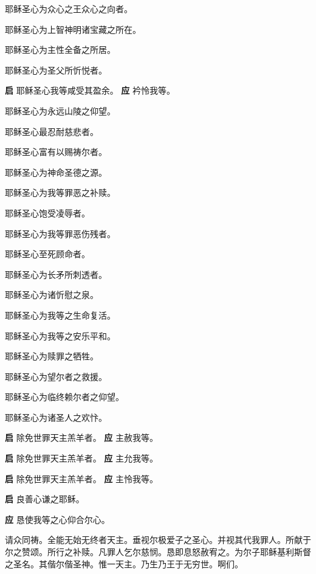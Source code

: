 \documentclass[UTF8,17pt]{ctexart}
\begin{document}
 耶稣圣⼼为众⼼之王众⼼之向者。

 耶稣圣⼼为上智神明诸宝藏之所在。

 耶稣圣⼼为主性全备之所居。

 耶稣圣⼼为圣⽗所忻悦者。

\textbf{启} \quad 耶稣圣⼼我等咸受其盈余。 \hfill \textbf{应} \quad 衿怜我等。

 耶稣圣⼼为永远⼭陵之仰望。

 耶稣圣⼼最忍耐慈悲者。

 耶稣圣⼼富有以赐祷尔者。

 耶稣圣⼼为神命圣德之源。

 耶稣圣⼼为我等罪恶之补赎。

 耶稣圣⼼饱受凌辱者。

 耶稣圣⼼为我等罪恶伤残者。

 耶稣圣⼼⾄死顾命者。

 耶稣圣⼼为长⽭所刺透者。

 耶稣圣⼼为诸忻慰之泉。

 耶稣圣⼼为我等之⽣命复活。

 耶稣圣⼼为我等之安乐平和。

 耶稣圣⼼为赎罪之牺牲。

 耶稣圣⼼为望尔者之救援。

 耶稣圣⼼为临终赖尔者之仰望。

 耶稣圣⼼为诸圣⼈之欢忭。

\textbf{启} \quad 除免世罪天主羔⽺者。 \hfill \textbf{应} \quad 主赦我等。

\textbf{启} \quad 除免世罪天主羔⽺者。 \hfill \textbf{应} \quad 主允我等。

\textbf{启} \quad 除免世罪天主羔⽺者。 \hfill \textbf{应} \quad 主怜我等。

\textbf{启} \quad 良善⼼谦之耶稣。

\textbf{应} \quad 恳使我等之⼼仰合尔⼼。

请众同祷。\quad 全能⽆始⽆终者天主。垂视尔极爱⼦之圣⼼。并视其代我罪⼈。所献于尔之赞颂。所⾏之补赎。凡罪⼈乞尔慈悯。恳即息怒赦宥之。为尔⼦耶稣基利斯督之圣名。其偕尔偕圣神。惟⼀天主。乃⽣乃王于⽆穷世。啊们。
\end{document}
